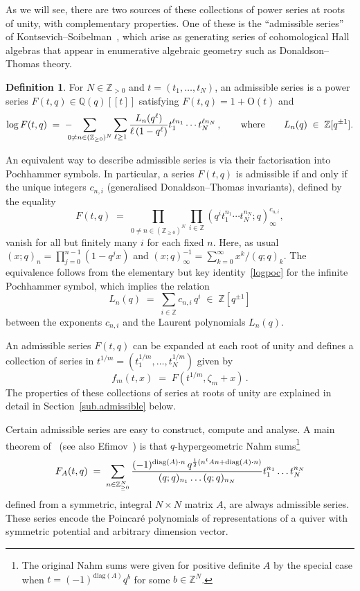 \documentclass[12pt,reqno]{amsart}
\theoremstyle{definition}
\newtheorem{definition}[proposition]{Definition}
\def\BZ{\mathbb Z}
\def\BQ{\mathbb Q}
\def\be{\begin{equation}}
\def\ee{\end{equation}}
\def\z{\zeta}
\def\diag{\mathrm{diag}}
\def\={\;=\;}
\def\inn{\;\in\;}
\def\Phitof{f}
\begin{document}
As we will see, there are two sources of these collections of power series at roots
of unity, with complementary properties.
One of these is the ``admissible series''
of Kontsevich--Soibelman~\cite[Sec.6]{KS:cohomological}, which arise as generating
series of cohomological Hall algebras that appear in enumerative algebraic geometry
such as Donaldson--Thomas theory.

\begin{definition}
For $N\in\BZ_{>0}$ and $t=(t_1,\dots,t_N)$, an admissible series is a power series
$F(t,q)\in\BQ(q)[\![t]\!]$ satisfying $F(t,q)=1+\mathrm{O}(t)$ and
\be
\label{logF}
\log F(t,q) \= -\!\!\!\!\sum_{0\neq n\in(\BZ_{\geq0})^N}\sum_{\ell \geq 1}
\frac{L_n(q^\ell)}{\ell\thinspace(1-q^\ell)}
t_1^{\ell n_1}\cdots t_N^{\ell n_N}\,,\qquad
\text{where}\qquad
L_n(q)\inn\BZ[q^{\pm1}].
\ee
\end{definition}

\noindent An equivalent way to describe admissible series is via their factorisation
into Pochhammer symbols. In particular, a series $F(t,q)$ is admissible if and only
if the unique integers $c_{n,i}$ (generalised Donaldson--Thomas invariants), defined
by the equality
\be
\label{defgamma}
F(t,q) \= \prod_{0\neq n\in(\BZ_{\geq0})^N}
\prod_{i \in \BZ} (q^i t_1^{n_1}\cdots t_N^{n_N};q)_\infty^{c_{n,i}},
\ee
vanish for all but finitely
many $i$ for each fixed $n$.
Here, as usual $(x;q)_n = \prod_{j=0}^{n-1}(1-q^j x)$
and
$(x;q)_{\infty}^{-1}=\sum_{k=0}^{\infty}x^k/(q;q)_k$.
The equivalence follows from the elementary but key identity~\eqref{logpoc}
for the infinite Pochhammer symbol, which implies the relation
\be
  L_n(q) \= \sum_{i \in \BZ} c_{n,i} \, q^i \inn \BZ[q^{\pm 1}]
\ee
between the exponents $c_{n,i}$ and the Laurent polynomials $L_{n}(q)$.

An admissible series $F(t,q)$ can be expanded at each root of unity and defines
a collection of series in $t^{1/m}=(t_1^{1/m},\dots,t_N^{1/m})$ given by
\be
\label{Phidef}
\Phitof_m(t,x) \= F(t^{1/m},\z_m+x) \,. %
\ee
The properties of these collections of series at roots of unity are explained in
detail in Section~\ref{sub.admissible} below.

Certain admissible series are easy to construct, compute and analyse.
A main theorem of~\cite[Sec., Thm.]{KS:cohomological} (see
also Efimov~\cite{Efimov}) is that $q$-hypergeometric Nahm
sums\footnote{The original Nahm sums were given for positive definite $A$ by the
  special case when $t=(-1)^{\diag(A)}q^{b}$ for some $b\in\BZ^{N}$.}
\be
\label{FAdef}
F_A(t,q) \= \sum_{n \in \BZ^N_{\ge0}} \frac{
(-1)^{\mathrm{diag}(A)\cdot n}\,
q^{\frac{1}{2}(n^t A n + \mathrm{diag}(A)\cdot n)} }{(q;q)_{n_1}
\dots (q;q)_{n_N}} t_1^{n_1} \dots t_N^{n_N}
\ee
defined from a symmetric, integral $N \times N$ matrix $A$,
are always admissible series. These series encode the Poincar\'e polynomials of
representations of a quiver with symmetric potential and arbitrary dimension vector.
\end{document}
